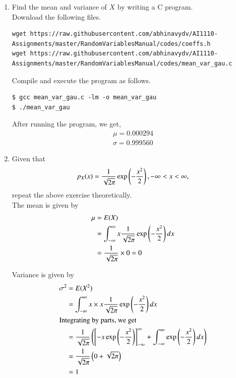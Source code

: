 \documentclass[journal,12pt,twocolumn]{IEEEtran}
\renewcommand\thesection{\arabic{section}}
\begin{document}
\begin{enumerate}[label=\thesection.\arabic*
        ,ref=\thesection.\theenumi]
    \item Find the mean and variance of $X$ by writing a C program.\\
          \solution Download the following files.
          \begin{lstlisting}
wget https://raw.githubusercontent.com/abhinavydv/AI1110-Assignments/master/RandomVariablesManual/codes/coeffs.h
wget https://raw.githubusercontent.com/abhinavydv/AI1110-Assignments/master/RandomVariablesManual/codes/mean_var_gau.c
  \end{lstlisting}

          Compile and execute the program as follows.
          \begin{lstlisting}
$ gcc mean_var_gau.c -lm -o mean_var_gau
$ ./mean_var_gau
  \end{lstlisting}

          After running the program, we get,
          \begin{align}
              \mu = 0.000294 \\
              \sigma = 0.999560
          \end{align}

    \item Given that
          \begin{align}
              \label{eq:exp_dist_given}
              p_{X}(x) = \frac{1}{\sqrt{2\pi}}\exp\left(-\frac{x^2}{2}\right), -\infty < x < \infty,
          \end{align}
          repeat the above exercise theoretically.\\
          \solution The mean is given by
          \begin{align}
              \mu & = E(X)                                                                       \\
                  & =\int_{-\infty}^{\infty} x \frac{1}{\sqrt{2\pi}}\exp\left(-\frac{x^2}{2}\right) dx \\
                  & = \frac{1}{\sqrt{2\pi}} \times 0 = 0
          \end{align}

          Variance is given by
          \begin{align}
              \sigma^2 & = E(X^2)                                                                                                                                     \\
                       & = \int_{-\infty}^\infty x\times x \frac{1}{\sqrt{2\pi}}\exp\left(-\frac{x^2}{2}\right) dx                                                          \\
              \intertext{Integrating by parts, we get}
                       & = \frac{1}{\sqrt{2\pi}} \left(\left[-x\exp\left(-\frac{x^2}{2}\right)\right]_{-\infty}^{\infty}+\int_{-\infty}^\infty \exp\left(-\frac{x^2}{2}\right)dx\right) \\
                       & = \frac{1}{\sqrt{2\pi}} \left(0 + \sqrt{2\pi}\right)                                                                                               \\
                       & = 1
          \end{align}


\end{enumerate}
\end{document}
